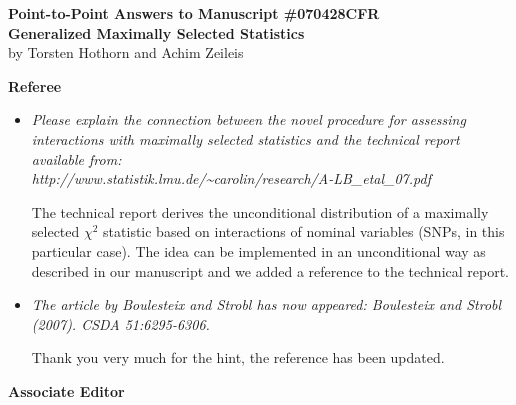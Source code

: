 \documentclass[11pt,a4paper]{article}
\begin{document}


\begin{center}
\textbf{\large Point-to-Point Answers to Manuscript \#070428CFR \\
Generalized Maximally Selected Statistics} \\
by Torsten Hothorn and Achim Zeileis
\end{center}

\vspace*{1cm}

\textbf{\large Referee}

\begin{itemize}

  \item \textit{Please explain the connection between the novel procedure
for assessing interactions with maximally selected statistics and
the technical report available from: \\
http://www.statistik.lmu.de/\~{}carolin/research/A-LB\_etal\_07.pdf}

The technical report derives the unconditional distribution of
a maximally selected $\chi^2$ statistic based on interactions
of nominal variables (SNPs, in this particular case). The idea 
can be implemented in an unconditional way as described in 
our manuscript and we added a reference to the technical report.

\item \textit{The article by Boulesteix and Strobl has now appeared:
Boulesteix and Strobl (2007). CSDA 51:6295-6306.}

Thank you very much for the hint, the reference has been updated.

\end{itemize}

\textbf{\large Associate Editor}
\end{document}
